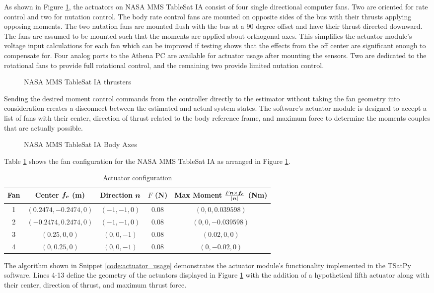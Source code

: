 As shown in Figure \ref{fig:TSatThrusters}, the actuators on NASA MMS TableSat IA consist of four single directional computer fans.  Two are oriented for rate control and two for nutation control.  The body rate control fans are mounted on opposite sides of the bus with their thrusts applying opposing moments.  The two nutation fans are mounted flush with the bus at a 90 degree offset and have their thrust directed downward.  The fans are assumed to be mounted such that the moments are applied about orthogonal axes.  This simplifies the actuator module's voltage input calculations for each fan which can be improved if testing shows that the effects from the off center are significant enough to compensate for.  Four analog ports to the Athena PC are available for actuator usage after mounting the sensors.  Two are dedicated to the rotational fans to provide full rotational control, and the remaining two provide limited nutation control.
\begin{figure}[H]
  \centerline{}
  \caption{NASA MMS TableSat IA thrusters}
  \label{fig:TSatThrusters}
\end{figure}
Sending the desired moment control commands from the controller directly to the estimator without taking the fan geometry into consideration creates a disconnect between the estimated and actual system states.  The software's actuator module is designed to accept a list of fans with their center, direction of thrust related to the body reference frame, and maximum force to determine the moments couples that are actually possible.
\begin{figure}[H]
  \centerline{}
  \caption{NASA MMS TableSat IA Body Axes}
  \label{fig:TableSatBodyAxes}
\end{figure}
Table \ref{tbl:ActuatorConfiguration} shows the fan configuration for the NASA MMS TableSat IA as arranged in Figure \ref{fig:TSatThrusters}.
\begin{table}[H]
  \centering
  \begin{tabular}{c|c|c|c|c}
    Fan & Center $\boldsymbol{f_c}$ (m) & Direction $\boldsymbol{n}$ & $F$ (N) & Max Moment $\frac{F \boldsymbol{n} \times \boldsymbol{f_c}}{|\boldsymbol{n}|}$ (Nm) \\ \hline
    1 & $(0.2474, -0.2474, 0)$ & $(-1, -1, 0)$ & 0.08 & $(0, 0, 0.039598)$ \\
    2 & $(-0.2474, 0.2474, 0)$ & $(-1, -1, 0)$ & 0.08 & $(0, 0, -0.039598)$ \\
    3 & $(0.25, 0, 0)$ & $(0, 0, -1)$ & 0.08 & $(0.02, 0, 0)$ \\
    4 & $(0, 0.25, 0)$ & $(0, 0, -1)$ & 0.08 & $(0, -0.02, 0)$ \\
  \end{tabular}
  \caption{Actuator configuration}
  \label{tbl:ActuatorConfiguration}
\end{table}
The algorithm shown in Snippet \ref{code:actuator_usage} demonstrates the actuator module's functionality implemented in the TSatPy software.  Lines 4-13 define the geometry of the actuators displayed in Figure \ref{fig:TSatThrusters} with the addition of a hypothetical fifth actuator along with their center, direction of thrust, and maximum thrust force.


